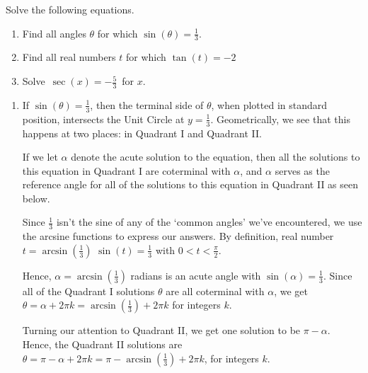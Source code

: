 \documentclass{ximera}
\begin{document}
\begin{example}  \label{basicinverseeqns}  Solve the following equations.

\begin{enumerate}

\item  \label{basicinverseeqnssine} Find all angles $\theta$ for which $\sin(\theta) = \frac{1}{3}$.

\item \label{basicinverseeqnstangent} Find all real numbers $t$ for which $\tan(t) = -2$

\item  \label{basicinverseeqnssecant} Solve $\, \sec(x) = -\frac{5}{3} \,$ for $x$.

\end{enumerate}

\begin{explanation}

\begin{enumerate}

\item  If $\sin(\theta) = \frac{1}{3}$, then the terminal side of $\theta$, when plotted in standard position, intersects the Unit Circle at $y = \frac{1}{3}$.  Geometrically, we see that this happens at two places:  in Quadrant I and Quadrant II. 

 

If we let $\alpha$ denote the acute solution to the equation, then all the solutions to this equation in Quadrant I  are coterminal with $\alpha$, and $\alpha$ serves as the reference angle for all of the solutions to this equation in Quadrant II as seen below.

 

Since $\frac{1}{3}$ isn't the sine of any of the `common angles' we've encountered, we use the arcsine functions to express our answers.  By definition,  real number $t = \arcsin\left(\frac{1}{3}\right)$  $\sin(t) = \frac{1}{3}$ with $0 < t < \frac{\pi}{2}$.  

 

Hence, $\alpha = \arcsin\left(\frac{1}{3}\right)$ radians is an acute angle with $\sin(\alpha) = \frac{1}{3}$. Since all of the Quadrant I solutions $\theta$  are all coterminal with $\alpha$, we get $\theta = \alpha + 2\pi k  = \arcsin\left(\frac{1}{3}\right) + 2\pi k$ for integers $k$. 

 

 Turning our attention to Quadrant II, we get one solution to be $\pi - \alpha$.  Hence, the Quadrant II solutions are  $\theta = \pi - \alpha + 2\pi k = \pi - \arcsin\left(\frac{1}{3}\right) + 2\pi k$, for integers $k$.


\end{enumerate}
\end{explanation}
\end{example}
\end{document}
